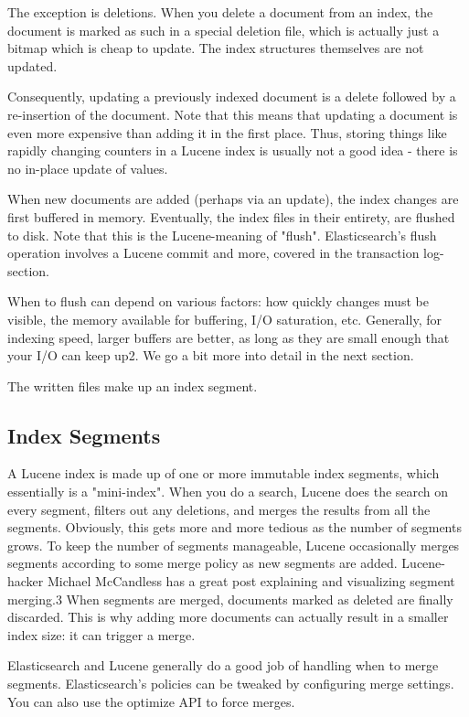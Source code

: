 The exception is deletions. When you delete a document from an index, the document is marked as such in a special deletion file, which is actually just a bitmap which is cheap to update. The index structures themselves are not updated.

Consequently, updating a previously indexed document is a delete followed by a re-insertion of the document. Note that this means that updating a document is even more expensive than adding it in the first place. Thus, storing things like rapidly changing counters in a Lucene index is usually not a good idea - there is no in-place update of values.

When new documents are added (perhaps via an update), the index changes are first buffered in memory. Eventually, the index files in their entirety, are flushed to disk. Note that this is the Lucene-meaning of "flush". Elasticsearch's flush operation involves a Lucene commit and more, covered in the transaction log-section.

When to flush can depend on various factors: how quickly changes must be visible, the memory available for buffering, I/O saturation, etc. Generally, for indexing speed, larger buffers are better, as long as they are small enough that your I/O can keep up2. We go a bit more into detail in the next section.

The written files make up an index segment.

\subsection*{Index Segments}

A Lucene index is made up of one or more immutable index segments, which essentially is a "mini-index". When you do a search, Lucene does the search on every segment, filters out any deletions, and merges the results from all the segments. Obviously, this gets more and more tedious as the number of segments grows. To keep the number of segments manageable, Lucene occasionally merges segments according to some merge policy as new segments are added. Lucene-hacker Michael McCandless has a great post explaining and visualizing segment merging.3 When segments are merged, documents marked as deleted are finally discarded. This is why adding more documents can actually result in a smaller index size: it can trigger a merge.

Elasticsearch and Lucene generally do a good job of handling when to merge segments. Elasticsearch's policies can be tweaked by configuring merge settings. You can also use the optimize API to force merges.


